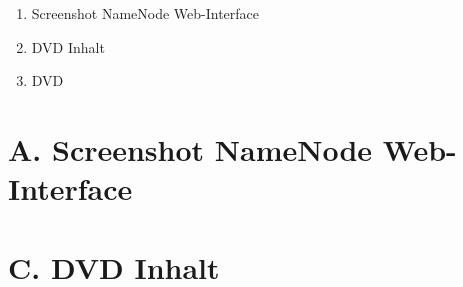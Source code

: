 
\addchap{\langanhang}

{\Large
\begin{enumerate}[label=\Alph*.]
	\item Screenshot NameNode Web-Interface
	\item DVD Inhalt
	\item DVD 
\end{enumerate}
}
\pagebreak

\section*{A. Screenshot NameNode Web-Interface}\label{sec:ScreenNameNodeWeb}

\pagebreak

\section*{C. DVD Inhalt}
 